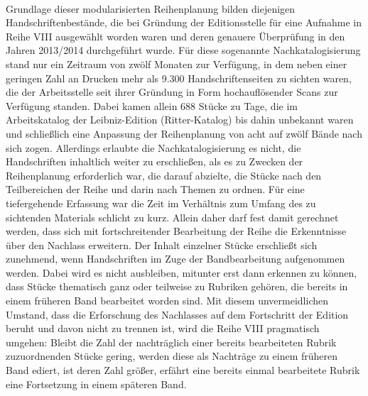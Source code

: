 \\ \indent
Grundlage dieser modularisierten Reihenplanung bilden diejenigen Handschriftenbestände, die bei Gründung der Editionsstelle für eine Aufnahme in Reihe VIII ausgewählt worden waren und deren genauere Überprüfung in den Jahren 2013/2014 durchgeführt wurde. Für diese sogenannte Nachkatalogisierung stand nur ein Zeitraum von zwölf Monaten zur Verfügung, in dem neben einer geringen Zahl an Drucken mehr als 9.300 Handschriftenseiten zu sichten waren, die der Arbeitsstelle seit ihrer Gründung in Form hochauflösender Scans zur Verfügung standen. Dabei kamen allein 688 Stücke zu Tage, die im Arbeitskatalog der Leibniz-Edition (\glqq Ritter-Katalog\grqq) bis dahin unbekannt waren und schließlich eine Anpassung der Reihenplanung von acht auf zwölf Bände nach sich zogen. 
Allerdings erlaubte die Nachkatalogisierung es nicht, die Handschriften inhaltlich weiter zu erschließen, als es zu Zwecken der Reihenplanung erforderlich war, die darauf abzielte, die Stücke nach den Teilbereichen der Reihe und darin nach Themen zu ordnen. Für eine tiefergehende Erfassung war die Zeit im Verhältnis zum Umfang des zu sichtenden Materials schlicht zu kurz. 
Allein daher darf fest damit gerechnet werden, dass sich mit fortschreitender Bearbeitung der Reihe die Erkenntnisse über den Nachlass erweitern. Der Inhalt einzelner Stücke erschließt sich zunehmend, wenn Handschriften im Zuge der Bandbearbeitung aufgenommen werden. Dabei wird es nicht ausbleiben, mitunter erst dann erkennen zu können, dass Stücke thematisch ganz oder teilweise  zu Rubriken gehören, die bereits in einem früheren Band bearbeitet worden sind. 
Mit diesem unvermeidlichen Umstand, dass die Erforschung des Nachlasses auf dem Fortschritt der Edition beruht und davon nicht zu trennen ist, wird die Reihe VIII pragmatisch umgehen: Bleibt die Zahl der nachträglich einer bereits bearbeiteten Rubrik zuzuordnenden Stücke gering, werden diese als Nachträge zu einem früheren Band ediert, ist deren Zahl größer, erfährt eine bereits einmal bearbeitete Rubrik eine Fortsetzung in einem späteren Band. 
